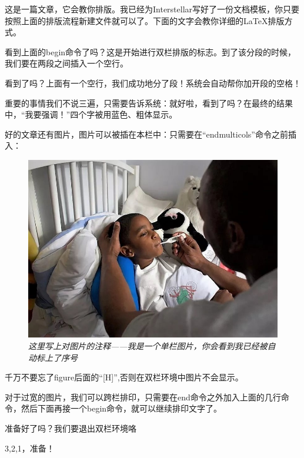 \begin{multicols}{3}
    这是一篇文章，它会教你排版。我已经为Interstellar写好了一份文档模板，你只要按照上面的排版流程新建文件就可以了。下面的文字会教你详细的LaTeX排版方式。
    
    看到上面的begin命令了吗？这是开始进行双栏排版的标志。到了该分段的时候，我们要在两段之间插入一个空行。
    
    看到了吗？上面有一个空行，我们成功地分了段！系统会自动帮你加开段的空格！
    
    重要的事情我们不说三遍，只需要告诉系统：就好啦，看到了吗？在最终的结果中，“我要强调！”四个字被用蓝色、粗体显示。
    
    好的文章还有图片，图片可以被插在本栏中：只需要在“end{multicols}”命令之前插入：
    
    \begin{figure}[H]
        \centering
        \includegraphics[width=\linewidth]{IMG/202001/pjtw.jpg}
        \caption{\textit{这里写上对图片的注释——我是一个单栏图片，你会看到我已经被自动标上了序号}}
    \end{figure}
    
    千万不要忘了{figure}后面的“[H]”,否则在双栏环境中图片不会显示。
    
    对于过宽的图片，我们可以跨栏排印，只需要在end命令之外加入上面的几行命令，然后下面再接一个begin命令，就可以继续排印文字了。
    
    准备好了吗？我们要退出双栏环境咯
    
    3,2,1，准备！
\end{multicols}
    
